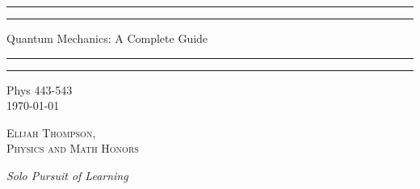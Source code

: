 \documentclass[12pt, a4paper, oneside, openright, titlepage]{book}
\begin{document}

\begin{titlepage}
    \centering
    \scshape
    \vspace*{\baselineskip}
    \rule{\textwidth}{1.6pt}\vspace*{-\baselineskip}\vspace*{2pt}
    \rule{\textwidth}{0.4pt}
    
    \vspace{0.75\baselineskip}
    
    {\LARGE Quantum Mechanics: A Complete Guide}
    
    \vspace{0.75\baselineskip}
    
    \rule{\textwidth}{0.4pt}\vspace*{-\baselineskip}\vspace{3.2pt}
    \rule{\textwidth}{1.6pt}
    
    \vspace{2\baselineskip}
    Phys 443-543 \\
    \vspace*{3\baselineskip}
    \monthdayyeardate\today \\
    \vspace*{5.0\baselineskip}
    
    {\scshape\Large Elijah Thompson, \\ Physics and Math Honors\\}
    
    \vspace{1.0\baselineskip}
    \textit{Solo Pursuit of Learning}
    \vfill
    \enlargethispage{1in}
    \begin{figure}[b!]
    \end{figure}
\end{titlepage}
\end{document}
